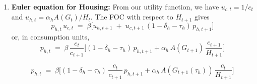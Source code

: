 \begin{enumerate}
    \begin{equation}
        \kappa\bigl(1+\phi(G_t)\bigr)^{1+\theta}n_t^{\theta} = \frac{(1-\tau_L)w_t}{c_t} \label{eq:labor}
    \end{equation}

    \begin{equation}
            n_t \;=\;\Biggl[\,
            \frac{(1-\tau_L)\,w_t}
                {\kappa\,c_t\,\bigl(1+\phi(G_t)\bigr)^{1+\theta}}
            \Biggr]^{\!1/\theta}\!
    \end{equation}

    Intuitively, the marginal rate of substitution between leisure (or time) and consumption equals the real after-tax wage. 
    An increase in commuting factor $\phi(G_t)$ (worse roads) raises the left-hand side (effective disutility of labor), leading the household to supply less labor for a given wage. This aligns with the idea that poor road quality reduces effective labor supply as households require higher compensation to work the same hours because commuting erodes their usable time.

  \item \textbf{Euler equation for Housing:}
  From our utility function, we have $u_{c,t}=1/c_t$ and $u_{h,t}=\alpha_h A(G_t)/H_t$. The FOC with respect to $H_{t+1}$ gives
  \begin{equation}
  p_{h,t}\,u_{c,t}
  \;=\; \beta\Big[u_{h,t+1} \;+\; u_{c,t+1}\,(1-\delta_h-\tau_h)\,p_{h,t+1}\Big]
  \label{eq:euler_H_util}
  \end{equation}
  or, in consumption units,
  \begin{equation}
    p_{h,t}
    \;=\; \beta\,\frac{c_t}{c_{t+1}}
    \Big[
    (1-\delta_h-\tau_h)\,p_{h,t+1}
    + \alpha_h\,A(G_{t+1})\,\frac{c_{t+1}}{H_{t+1}}
    \Big]
    \label{eq:euler_H_cons}
  \end{equation}

  \begin{equation}
    p_{h,t}
    \;=\;
    \beta\Big[
    (1-\delta_h-\tau_h)\,\frac{c_t}{c_{t+1}}\,p_{h,t+1}
    + \alpha_h\,A(G_{t+1}(\tau_h))\,\frac{c_t}{H_{t+1}}
    \Big]
  \label{eq:euler_H_cons2}
  \end{equation}


\end{enumerate}
